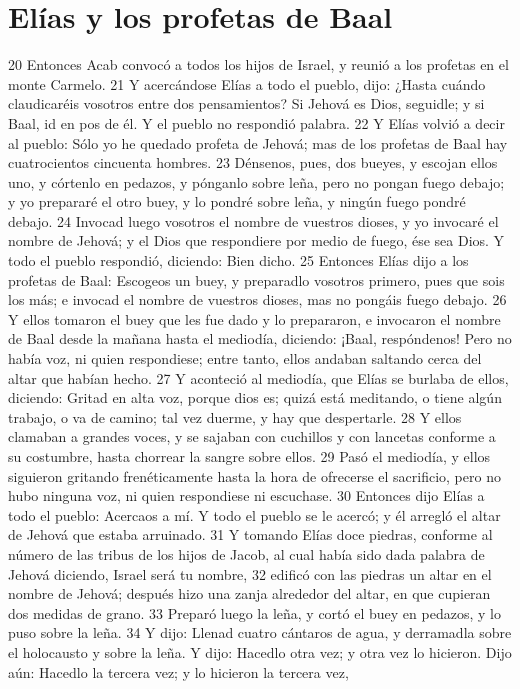 \section*{Elías y los profetas de Baal}

20 Entonces Acab convocó a todos los hijos de Israel, y reunió a los profetas en el monte Carmelo.
21 Y acercándose Elías a todo el pueblo, dijo: ¿Hasta cuándo claudicaréis vosotros entre dos pensamientos? Si Jehová es Dios, seguidle; y si Baal, id en pos de él. Y el pueblo no respondió palabra.
22 Y Elías volvió a decir al pueblo: Sólo yo he quedado profeta de Jehová; mas de los profetas de Baal hay cuatrocientos cincuenta hombres.
23 Dénsenos, pues, dos bueyes, y escojan ellos uno, y córtenlo en pedazos, y pónganlo sobre leña, pero no pongan fuego debajo; y yo prepararé el otro buey, y lo pondré sobre leña, y ningún fuego pondré debajo.
24 Invocad luego vosotros el nombre de vuestros dioses, y yo invocaré el nombre de Jehová; y el Dios que respondiere por medio de fuego, ése sea Dios. Y todo el pueblo respondió, diciendo: Bien dicho.
25 Entonces Elías dijo a los profetas de Baal: Escogeos un buey, y preparadlo vosotros primero, pues que sois los más; e invocad el nombre de vuestros dioses, mas no pongáis fuego debajo.
26 Y ellos tomaron el buey que les fue dado y lo prepararon, e invocaron el nombre de Baal desde la mañana hasta el mediodía, diciendo: ¡Baal, respóndenos! Pero no había voz, ni quien respondiese; entre tanto, ellos andaban saltando cerca del altar que habían hecho.
27 Y aconteció al mediodía, que Elías se burlaba de ellos, diciendo: Gritad en alta voz, porque dios es; quizá está meditando, o tiene algún trabajo, o va de camino; tal vez duerme, y hay que despertarle.
28 Y ellos clamaban a grandes voces, y se sajaban con cuchillos y con lancetas conforme a su costumbre, hasta chorrear la sangre sobre ellos.
29 Pasó el mediodía, y ellos siguieron gritando frenéticamente hasta la hora de ofrecerse el sacrificio, pero no hubo ninguna voz, ni quien respondiese ni escuchase.
30 Entonces dijo Elías a todo el pueblo: Acercaos a mí. Y todo el pueblo se le acercó; y él arregló el altar de Jehová que estaba arruinado.
31 Y tomando Elías doce piedras, conforme al número de las tribus de los hijos de Jacob, al cual había sido dada palabra de Jehová diciendo, Israel será tu nombre, 
32 edificó con las piedras un altar en el nombre de Jehová; después hizo una zanja alrededor del altar, en que cupieran dos medidas   de grano.
33 Preparó luego la leña, y cortó el buey en pedazos, y lo puso sobre la leña.
34 Y dijo: Llenad cuatro cántaros de agua, y derramadla sobre el holocausto y sobre la leña. Y dijo: Hacedlo otra vez; y otra vez lo hicieron. Dijo aún: Hacedlo la tercera vez; y lo hicieron la tercera vez,
